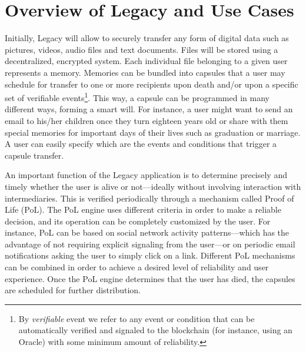 
\section{Overview of Legacy and Use Cases} %
\label{sec:overview_of_legacy_and_use_cases}

Initially, Legacy will allow to securely transfer any form of digital data such as pictures, videos, audio files and text documents. Files will be stored using a decentralized, encrypted system. Each individual file belonging to a given user represents a memory. Memories can be bundled into capsules that a user may schedule for transfer to one or more recipients upon death and/or upon a specific set of verifiable events\footnote{By \textit{verifiable} event we refer to any event or condition that can be automatically verified and signaled to the blockchain (for instance, using an Oracle) with some minimum amount of reliability.}. This way, a capsule can be programmed in many different ways, forming a smart will. For instance, a user might want to send an email to his/her children once they turn eighteen years old or share with them special memories for important days of their lives such as graduation or marriage. A user can easily specify which are the events and conditions that trigger a capsule transfer.

An important function of the Legacy application is to determine precisely and timely whether the user is alive or not---ideally without involving interaction with intermediaries. This is verified periodically through a mechanism called Proof of Life (PoL). The PoL engine uses different criteria in order to make a reliable decision, and its operation can be completely customized by the user. For instance, PoL can be based on social network activity patterns---which has the advantage of not requiring explicit signaling from the user---or on periodic email notifications asking the user to simply click on a link. Different PoL mechanisms can be combined in order to achieve a desired level of reliability and user experience. Once the PoL engine determines that the user has died, the capsules are scheduled for further distribution.

